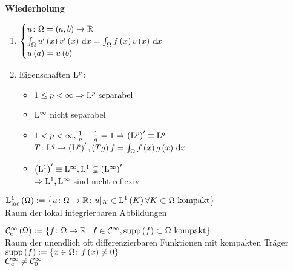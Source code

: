 \textbf{Wiederholung}\\
\begin{enumerate}
\item	
	$\begin{cases}
			u\colon\Omega=\left(a,b\right)\to\mathbb{R}\\
			\int_{\Omega}u^{\prime}\left(x\right)v^{\prime}\left(x\right)\,\mathrm{d}x = \int_{\Omega}f\left(x\right)v\left(x\right)\,\mathrm{d}x\\
			u\left(a\right)=u\left(b\right)
		\end{cases}$
\item{}
	Eigenschaften $\mathrm{L}^{p}$:\\
	\begin{itemize}
		\item $1\leq p <\infty \Rightarrow \mathrm{L}^{p}\text{ separabel}$
		\item $\mathrm{L}^{\infty}$ nicht separabel
		\item $1 < p <\infty, \frac{1}{p}+\frac{1}{q}=1 \Rightarrow \left(\mathrm{L}^{p}\right)^{\prime} \equiv \mathrm{L}^{q}$\\
			  $T\colon \mathrm{L}^{q}\to\left(\mathrm{L}^{p}\right)^{\prime}, \left(Tg\right)f = \int_{\Omega}f\left(x\right)g\left(x\right)\,\mathrm{d}x$
		\item $\left(\mathrm{L}^{1}\right)^{\prime}\equiv\mathrm{L}^{\infty}, \mathrm{L}^{1}\subsetneq\left(\mathrm{L}^{\infty}\right)^{\prime}$\\
				$\Rightarrow \mathrm{L}^{1}, \mathrm{L}^{\infty}$ sind nicht reflexiv
	\end{itemize}
\end{enumerate}

\begin{definition}
	$\mathrm{L}^{1}_{\text{loc}}\left(\Omega\right) := \left\{u\colon\Omega\to\mathbb{R}\colon u|_{K}\in\mathrm{L}^{1}\left(K\right)\forall K\subset\Omega \text{ kompakt}\right\}$\\
	Raum der lokal integrierbaren Abbildungen
\end{definition}

\begin{definition}
	$\mathcal{C}^{\infty}_{\text{c}}\left(\Omega\right) := \left\{f\colon\Omega\to\mathbb{R}\colon f\in\mathcal{C}^{\infty},\operatorname{supp}\left(f\right)\subset\Omega\text{ kompakt}\right\}$\\
	Raum der unendlich oft differenzierbaren Funktionen mit kompakten Träger\\
	$\operatorname{supp}\left(f\right):=\left\{x\in\Omega\colon f\left(x\right)\neq 0\right\}$\\
	\boldmath$C^{\infty}_{\text{c}}\neq \mathcal{C}^{\infty}_{0}$
\end{definition}

